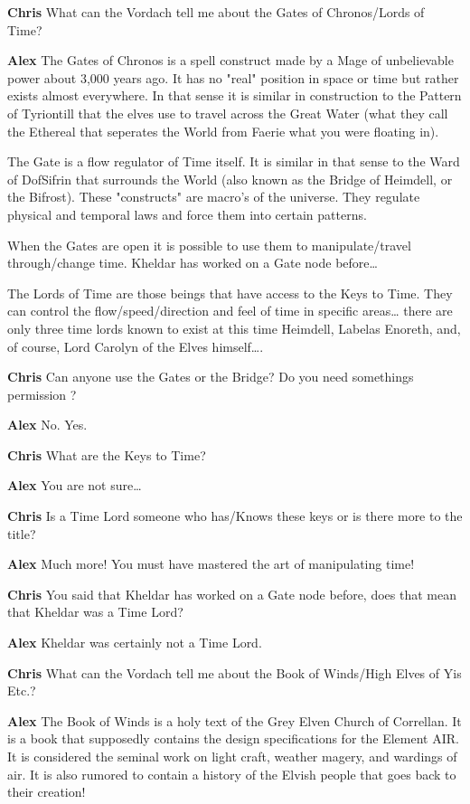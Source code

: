 
{\bf Chris} 
What can the Vordach tell me about the Gates of Chronos/Lords of Time?

{\bf Alex}
The Gates of Chronos is a spell construct made by a Mage of unbelievable power 
about 3,000 years ago. It has no "real" position in space or time but 
rather exists almost everywhere. In that sense it is similar in construction 
to the Pattern of Tyriontill that the elves use to travel across the 
Great Water (what they call the Ethereal that seperates the World from 
Faerie\- what you were floating in).

The Gate is a flow regulator\- of Time itself. It is similar in that sense 
to the Ward of Dof\-Sifrin that surrounds the World (also known as the Bridge 
of Heimdell, or the Bifrost). These "constructs" are macro's of the universe.
They regulate physical and temporal laws and force them into certain patterns.

When the Gates are open it is possible to use them to manipulate/travel 
through/change time. Kheldar has worked on a Gate node before\dots

The Lords of Time are those beings that have access to the Keys to Time. 
They can control the flow/speed/direction and feel of time in specific 
areas\dots 
there are only three time lords known to exist at this time Heimdell, Labelas 
Enoreth, and, of course, Lord Carolyn of the Elves himself\dots.

{\bf Chris} 
Can anyone use the Gates or the Bridge? Do you need somethings permission ?

{\bf Alex }
No. Yes. 

{\bf Chris} 
What are the Keys to Time? 

{\bf Alex }
You are not sure\dots

{\bf Chris} 
Is a Time Lord someone who has/Knows these keys or is there more to the title? 

{\bf Alex }
Much more! You must have mastered the art of manipulating time!

{\bf Chris} 
You said that Kheldar has worked on a Gate node before, does that mean 
that Kheldar was a Time Lord?

{\bf Alex }
Kheldar was certainly not a Time Lord.

{\bf Chris} 
What can the Vordach tell me about the Book of Winds/High Elves of Yis Etc.?

{\bf Alex }
The Book of Winds is a holy text of the Grey Elven Church of Correllan. 
It is a book that supposedly contains the design specifications for the 
Element AIR. It is considered the seminal work on light craft, weather magery, 
and wardings of air. It is also rumored to contain a history of the 
Elvish people that goes back to their creation! 

